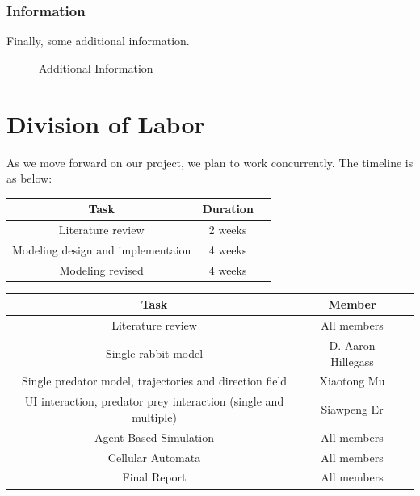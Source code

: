 \documentclass{article}
\begin{document}
\begin{normalsize}
\subsubsection{Information}
Finally, some additional information.
\begin{figure}[H]
	\caption{Additional Information}
\end{figure}


		\section{Division of Labor}
		As we move forward on our project, we plan to work concurrently. The timeline is as below:
		
		\begin{center}
			\begin{tabular}{ |c|c|c| } 
				\hline
				Task & Duration  \\ 
				\hline
				Literature review & 2 weeks \\ 
				Modeling design and implementaion & 4 weeks \\ 
				Modeling revised & 4 weeks \\ 
				\hline
			\end{tabular}
		\end{center}
	
		\begin{center}
			\begin{tabular}{ |c|c|c| } 
				\hline
				Task & Member  \\ 
				\hline
				Literature review & All members\\			
				Single rabbit model & D. Aaron Hillegass\\ 
				Single predator model, trajectories and direction field & Xiaotong Mu\\
				UI interaction, predator prey interaction (single and multiple) & Siawpeng Er\\
				Agent Based Simulation & All members\\
				Cellular Automata & All members\\
				Final Report & All members \\
				\hline
			\end{tabular}
		\end{center}

		
		
		
	\end{normalsize}
	
\end{document}
